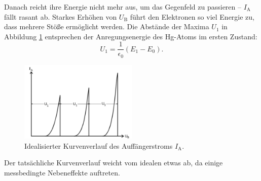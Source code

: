 Danach reicht ihre Energie nicht mehr aus, um das Gegenfeld zu passieren -- $I_\mathup{A}$ fällt rasant ab.
Starkes Erhöhen von $U_\mathup{B}$ führt den Elektronen so viel Energie zu, dass mehrere Stöße ermöglicht werden. 
Die Abstände der Maxima $U_1$ in Abbildung \ref{fig:id} entsprechen der Anregungsenergie des Hg-Atoms im ersten Zustand:
\begin{equation}
	U_1=\frac{1}{\epsilon_0}{(E_1-E_0)}.
\end{equation}
\begin{figure}
	\centering
	\includegraphics[width=0.5\textwidth]{Bilder/Kurve_Theo.pdf}
	\caption{Idealisierter Kurvenverlauf des Auffängerstroms $I_\mathup{A}$.\cite{skript}}
	\label{fig:id}
\end{figure}
Der tatsächliche Kurvenverlauf weicht vom idealen etwas ab, da einige messbedingte Nebeneffekte auftreten.

